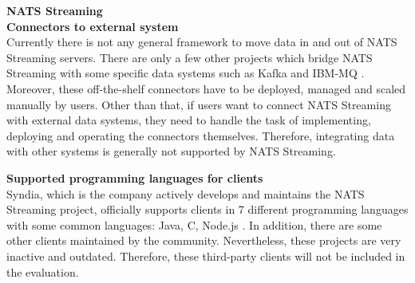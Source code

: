 \large \textbf{NATS Streaming}\\
\normalsize
\textbf{Connectors to external system}\\
Currently there is not any general framework to move data in and out of NATS Streaming servers. There are only a few other projects which bridge NATS Streaming with some specific data systems such as Kafka and IBM-MQ \cite{natsclientsconnectors}. Moreover, these off-the-shelf connectors have to be deployed, managed and scaled manually by users. Other than that, if users want to connect NATS Streaming with external data systems, they need to handle the task of implementing, deploying and operating the connectors themselves. Therefore, integrating data with other systems is generally not supported by NATS Streaming. 

\textbf{Supported programming languages for clients}\\
Syndia, which is the company actively develops and maintains the NATS Streaming project, officially supports clients in 7 different programming languages with some common languages: Java, C, Node.js \cite{natsclientsconnectors}. In addition, there are some other clients maintained by the community. Nevertheless, these projects are very inactive and outdated. Therefore, these third-party clients will not be included in the evaluation.      
